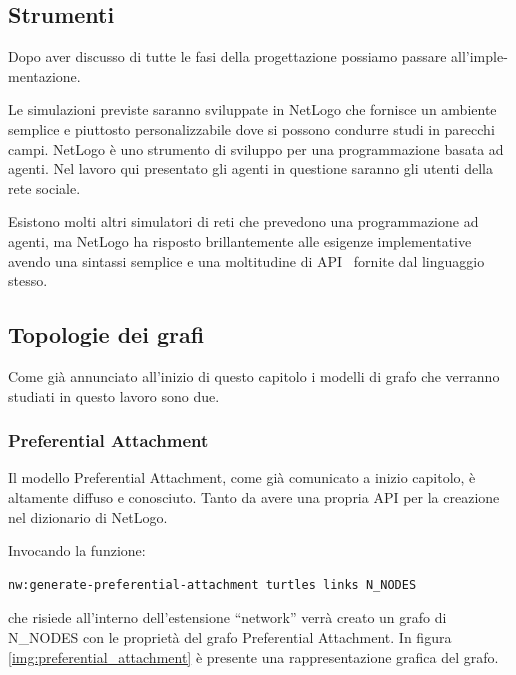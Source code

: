 \vspace{5 mm}
\subsection{Strumenti}
\vspace{3 mm}


Dopo aver discusso di tutte le fasi della progettazione possiamo passare all'imple-mentazione.

Le simulazioni previste saranno sviluppate in NetLogo che fornisce un ambiente semplice e piuttosto 
personalizzabile dove si possono condurre studi in parecchi campi.
NetLogo è uno strumento di sviluppo per una programmazione basata ad agenti.
Nel lavoro qui presentato gli agenti in questione saranno gli utenti della rete sociale.

Esistono molti altri simulatori di reti che prevedono una programmazione ad agenti, ma NetLogo
ha risposto brillantemente alle esigenze implementative avendo una sintassi semplice e una moltitudine di
API~\cite{biblio:netlogo_dictionary} fornite dal linguaggio stesso.


\subsection{Topologie dei grafi}
\label{section:preferential_attachment}
\vspace{3 mm}


Come già annunciato all'inizio di questo capitolo i modelli di grafo che verranno studiati in questo lavoro
sono due.


\subsubsection{Preferential Attachment}
Il modello Preferential Attachment, come già comunicato a inizio capitolo, è altamente diffuso e conosciuto.
Tanto da avere una propria API per la creazione nel dizionario di NetLogo.

Invocando la funzione:
\begin{lstlisting}[label=some-code, style=custom_code]
nw:generate-preferential-attachment turtles links N_NODES
\end{lstlisting}
che risiede all'interno dell'estensione ``network'' verrà creato un grafo di N\_NODES con le proprietà 
del grafo Preferential Attachment.
In figura \ref{img:preferential_attachment} è presente una rappresentazione grafica del grafo.


